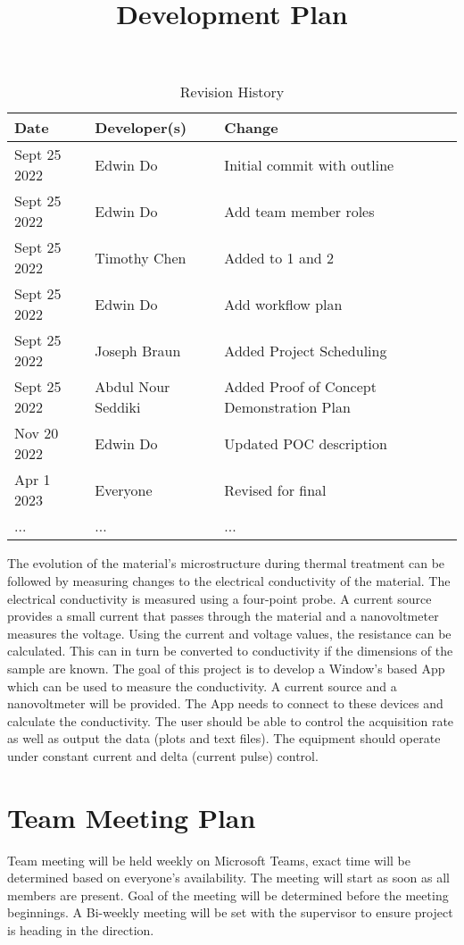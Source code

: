 \documentclass{article}
\title{Development Plan\\\progname}
\author{\authname}
\date{}
\begin{document}
\begin{table}[hp]
\caption{Revision History} \label{TblRevisionHistory}
\begin{tabularx}{\textwidth}{llX}
\toprule
\textbf{Date} & \textbf{Developer(s)} & \textbf{Change}\\
\midrule
Sept 25 2022 & Edwin Do & Initial commit with outline\\
Sept 25 2022 & Edwin Do & Add team member roles\\
Sept 25 2022 & Timothy Chen & Added to 1 and 2\\
Sept 25 2022 & Edwin Do & Add workflow plan \\
Sept 25 2022 & Joseph Braun & Added Project Scheduling \\
Sept 25 2022 & Abdul Nour Seddiki & Added Proof of Concept Demonstration Plan \\
Nov 20 2022 & Edwin Do & Updated POC description \\
Apr 1 2023 & Everyone & Revised for final \\
... & ... & ...\\
\bottomrule
\end{tabularx}
\end{table}

\newpage

\maketitle

\noindent The evolution of the material’s microstructure during thermal treatment can be followed by measuring changes to the electrical conductivity of the material. The electrical conductivity is measured using a four-point probe. A current source provides a small current that passes through the material and a nanovoltmeter measures the voltage. Using the current and voltage values, the resistance can be calculated. This can in turn be converted to conductivity if the dimensions of the sample are known. The goal of this project is to develop a Window’s based App which can be used to measure the conductivity. A current source and a nanovoltmeter will be provided. The App needs to connect to these devices and calculate the conductivity. The user should be able to control the acquisition rate as well as output the data (plots and text files). The equipment should operate under constant current and delta (current pulse) control.

\section{Team Meeting Plan}
Team meeting will be held weekly on Microsoft Teams, exact time will be determined based on everyone's availability.
The meeting will start as soon as all members are present. 
Goal of the meeting will be determined before the meeting beginnings. 
A Bi-weekly meeting will be set with the supervisor to ensure project is heading in the direction. 
\end{document}
